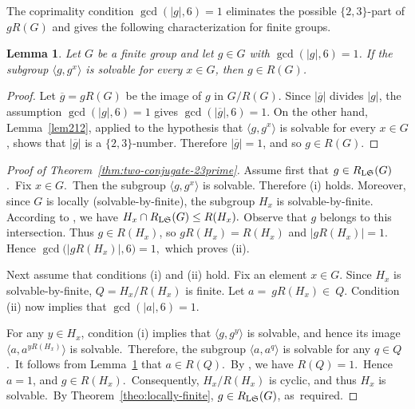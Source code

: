 \documentclass[11pt, reqno]{amsart}
\numberwithin{equation}{section}
\newtheorem{lemma}[theorem]{Lemma}
\theoremstyle{definition}
\numberwithin{equation}{section}
\begin{document}
The coprimality condition $\gcd(|g|,6)=1$ eliminates the possible
$\{2,3\}$-part of $gR(G)$ and gives the following characterization for finite groups.

\begin{lemma}\label{lem:twoconjugateschar}
Let $G$ be a finite group and let $g\in G$ with $\gcd(|g|,6)=1$. If the subgroup $\langle g,g^x\rangle$ is solvable for every $x\in G$, then $g \in R(G)$.
\end{lemma}
    
\begin{proof}
Let $\overline{g}=gR(G)$ be the image of $g$ in $G/R(G)$. Since
$|\overline{g}|$ divides $|g|$, the assumption $\gcd(|g|,6)=1$ gives
$\gcd(|\overline{g}|,6)=1.$
On the other hand, Lemma~\ref{lem212}, applied to the hypothesis that
$\langle g,g^x\rangle$ is solvable for every $x\in G$, shows that
$|\overline{g}|$ is a $\{2,3\}$-number. Therefore $|\overline{g}|=1$, and so $g\in R(G)$.
\end{proof}


\begin{proof}[Proof of Theorem~\ref{thm:two-conjugate-23prime}]
Assume first that $g \in R_{\textup{L}\mathfrak{S}}(G)$.~Fix  $x \in G$.~Then the subgroup $\langle g, g^x \rangle$ 
is solvable. Therefore \textup{(i)} holds. Moreover, since $G$ is locally (solvable-by-finite), the subgroup $H_x$ is solvable-by-finite. According to \cite[Lemma 2.5]{CNH2025}, we have $H_x \cap R_{\textup{L}\mathfrak{S}}(G) \leq R(H_x).$ Observe that $g$ belongs to this intersection. Thus $g\in R(H_x)$, so $gR(H_x)=R(H_x)$ and $|gR(H_x)|=1.$ Hence $\gcd\bigl(|gR(H_x)|,6\bigr)=1,$ which proves \textup{(ii)}.

Next assume that conditions (i) and (ii) hold. Fix an element $x \in G$. Since $H_x$ is solvable-by-finite,  $Q = H_x/R(H_x)$ is finite. Let $a =~gR(H_x) \in~Q$.  Condition (ii) now implies that $\gcd(|a|, 6) = 1$.

For any $y \in H_x$, condition (i) implies that $\langle g, g^y \rangle$ is solvable, and hence its image $\langle a, a^{yR(H_x)} \rangle$ is solvable.~Therefore,  the subgroup $\langle a, a^q \rangle$ is solvable for any $q \in Q$.~It follows from Lemma~\ref{lem:twoconjugateschar} that $a \in R(Q)$.~By \cite[Theorem~2.8]{CNH2025}, we have $R(Q)=1$.~Hence $a=1$, and $g\in R(H_x)$.~Consequently, $H_x/R(H_x)$ is cyclic, and thus $H_x$ is solvable.~By Theorem~\ref{theo:locally-finite}, $g \in R_{\textup{L}\mathfrak{S}}(G)$, as~required.
\end{proof}
\end{document}

